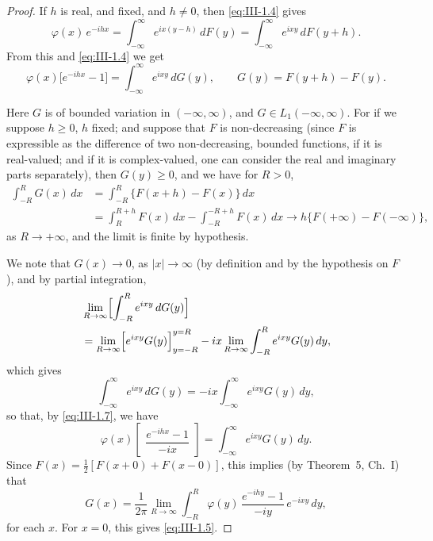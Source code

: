 \begin{proof}
If $h$ is real, and fixed, and $h\neq0$, then \eqref{eq:III-1.4} gives
\begin{equation}\tag{1.6}\label{eq:III-1.6}
\varphi(x)\,e^{-ihx}=\int_{-\infty}^{\infty}e^{ix(y-h)}\,dF(y)=\int_{-\infty}^{\infty}e^{ixy}\,dF(y+h).
\end{equation}
From this and \eqref{eq:III-1.4} we get
\begin{equation}\tag{1.7}\label{eq:III-1.7}
\varphi(x)\bigl[e^{-ihx}-1\bigr]=\int_{-\infty}^{\infty}e^{ixy}\,dG(y),\qquad G(y)=F(y+h)-F(y).
\end{equation}

Here $G$ is of bounded variation in $(-\infty,\infty)$, and $G\in L_{1}(-\infty,\infty)$. For if we suppose $h\ge0$, $h$ fixed; and suppose that $F$ is non-decreasing (since $F$ is expressible as the difference of two non-decreasing, bounded functions, if it is real-valued; and if it is complex-valued, one can consider the real and imaginary parts separately), then $G(y)\ge0$, and we have for $R>0$,
\[
\begin{aligned}
\int_{-R}^{R}G(x)\,dx &= \int_{-R}^{R}\bigl\{F(x+h)-F(x)\bigr\}\,dx\\
&= \int_{R}^{R+h}F(x)\,dx-\int_{-R}^{-R+h}F(x)\,dx\to h\bigl\{F(+\infty)-F(-\infty)\bigr\},
\end{aligned}
\]
as $R\to+\infty$, and the limit is finite by hypothesis.

We note that $G(x)\to0$, as $|x|\to\infty$ (by definition and by the hypothesis on $F$), and by partial integration,
\[
\begin{aligned}
&\lim_{R\to\infty}  \Bigl[\int_{-R}^{R}e^{ixy}\,dG(y)\Bigr]\\
&= \lim_{R\to\infty}  \Bigl[e^{ixy}G(y)\Bigr]_{y=-R}^{y=R} - ix\lim_{R\to\infty}  \int_{-R}^{R}e^{ixy}G(y)\,dy,
\end{aligned}
\]
which gives
\[
\int_{-\infty}^{\infty}e^{ixy}\,dG(y)=-ix\int_{-\infty}^{\infty}e^{ixy}G(y)\,dy,
\]
so that, by \eqref{eq:III-1.7}, we have
\[
\varphi(x)\begin{bmatrix}\dfrac{e^{-ihx}-1}{-ix}\end{bmatrix}
=\int_{-\infty}^{\infty}e^{ixy}G(y)\,dy.
\]
Since $F(x)=\frac12[F(x+0)+F(x-0)]$, this implies (by Theorem~5, Ch.~I) that
\[
G(x)=\frac{1}{2\pi}\lim_{R\to\infty}\int_{-R}^{R}\varphi(y)\,\frac{e^{-ihy}-1}{-iy}\,e^{-ixy}\,dy,
\]
for each $x$. For $x=0$, this gives \eqref{eq:III-1.5}.
\end{proof}

